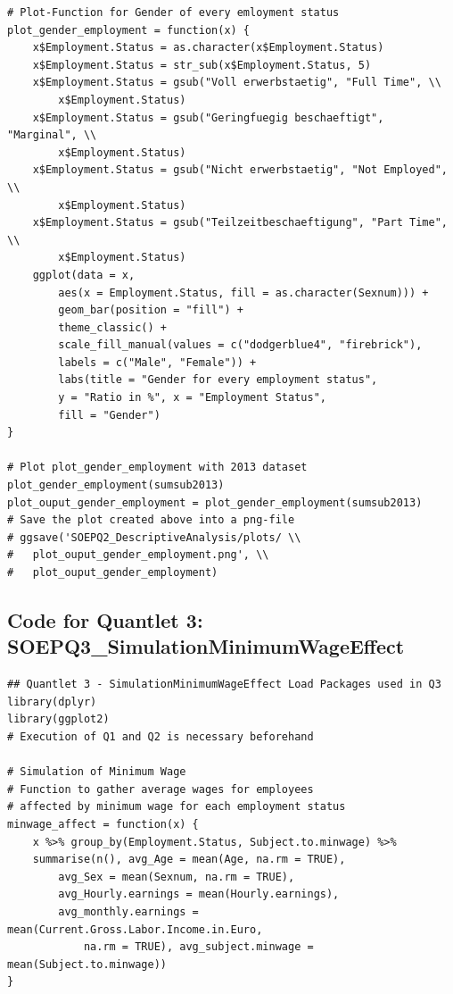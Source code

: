 \documentclass[a4paper]{article}
\begin{document}
{\begin{lstlisting}
# Plot-Function for Gender of every emloyment status
plot_gender_employment = function(x) {
    x$Employment.Status = as.character(x$Employment.Status)
    x$Employment.Status = str_sub(x$Employment.Status, 5)
    x$Employment.Status = gsub("Voll erwerbstaetig", "Full Time", \\
    	x$Employment.Status)
    x$Employment.Status = gsub("Geringfuegig beschaeftigt", "Marginal", \\
    	x$Employment.Status)
    x$Employment.Status = gsub("Nicht erwerbstaetig", "Not Employed", \\
    	x$Employment.Status)
    x$Employment.Status = gsub("Teilzeitbeschaeftigung", "Part Time", \\
    	x$Employment.Status)
    ggplot(data = x, 
    	aes(x = Employment.Status, fill = as.character(Sexnum))) + 
        geom_bar(position = "fill") + 
        theme_classic() + 
        scale_fill_manual(values = c("dodgerblue4", "firebrick"), 
        labels = c("Male", "Female")) + 
        labs(title = "Gender for every employment status",
        y = "Ratio in %", x = "Employment Status", 
        fill = "Gender")
}

# Plot plot_gender_employment with 2013 dataset
plot_gender_employment(sumsub2013)
plot_ouput_gender_employment = plot_gender_employment(sumsub2013)
# Save the plot created above into a png-file 
# ggsave('SOEPQ2_DescriptiveAnalysis/plots/ \\
# 	plot_ouput_gender_employment.png', \\
#	plot_ouput_gender_employment)
\end{lstlisting}
\newpage
\subsection{Code for Quantlet 3: SOEPQ3\_SimulationMinimumWageEffect}
\begin{lstlisting}
## Quantlet 3 - SimulationMinimumWageEffect Load Packages used in Q3
library(dplyr)
library(ggplot2)
# Execution of Q1 and Q2 is necessary beforehand

# Simulation of Minimum Wage 
# Function to gather average wages for employees 
# affected by minimum wage for each employment status
minwage_affect = function(x) {
    x %>% group_by(Employment.Status, Subject.to.minwage) %>% 
    summarise(n(), avg_Age = mean(Age, na.rm = TRUE), 
        avg_Sex = mean(Sexnum, na.rm = TRUE), 
        avg_Hourly.earnings = mean(Hourly.earnings), 
        avg_monthly.earnings = mean(Current.Gross.Labor.Income.in.Euro, 
            na.rm = TRUE), avg_subject.minwage = mean(Subject.to.minwage))
}


\end{lstlisting}}
\end{document}
